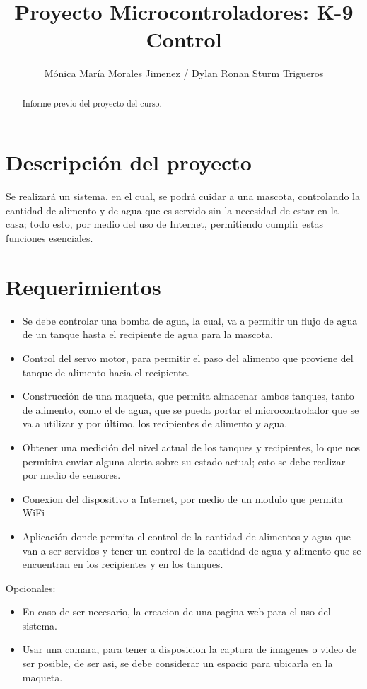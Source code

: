 \documentclass[12pt,letterpaper]{IEEEtran}
\title{Proyecto Microcontroladores: K-9 Control}
\author{Mónica María Morales Jimenez / Dylan Ronan Sturm Trigueros}
\begin{document}
\renewcommand{\leftmark}{UNIVERSIDAD LATINA DE COSTA RICA -- BINGE-61 Microcontroladores}

\maketitle


\begin{abstract}
Informe previo del proyecto del curso.
\end{abstract}

\section{Descripción del proyecto}

Se realizará un sistema, en el cual, se podrá cuidar a una mascota, controlando la cantidad de alimento y de agua que es servido sin la necesidad de estar en la casa; todo esto, por medio del uso de Internet, permitiendo cumplir estas funciones esenciales. 

\section{Requerimientos}

\begin{itemize}
	\item Se debe controlar una bomba de agua, la cual, va a permitir un flujo de agua de un tanque hasta el recipiente de agua para la mascota.
	\item Control del servo motor, para permitir el paso del alimento que proviene del tanque de alimento hacia el recipiente.
	\item Construcción de una maqueta, que permita almacenar ambos tanques, tanto de alimento, como el de agua, que se pueda portar el microcontrolador que se va a utilizar y por último, los recipientes de alimento y agua.
	\item Obtener una medición del nivel actual de los tanques y recipientes, lo que nos permitira enviar alguna alerta sobre su estado actual; esto se debe realizar por medio de sensores.
	\item Conexion del dispositivo a Internet, por medio de un modulo que permita WiFi
	\item Aplicación donde permita el control de la cantidad de alimentos y agua que van a ser servidos y tener un control de la cantidad de agua y alimento que se encuentran en los recipientes y en los tanques. 
\end{itemize}
Opcionales:

\begin{itemize}
	\item En caso de ser necesario, la creacion de una pagina web para el uso del sistema.
	\item Usar una camara, para tener a disposicion la captura de imagenes o video de ser posible, de ser asi, se debe considerar un espacio para ubicarla en la maqueta.
\end{itemize}
\end{document}
